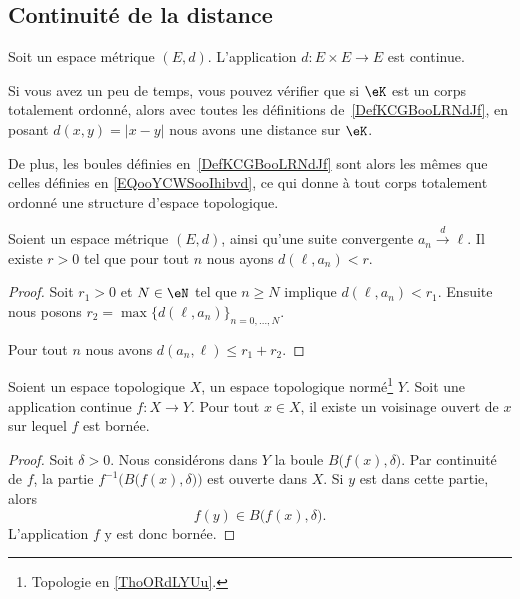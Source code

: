 \subsection{Continuité de la distance}


\begin{proposition}	\label{PROPooSZMLooNdtLLj}
	Soit un espace métrique \( (E,d)\). L'application \(d \colon E\times E\to E  \) est continue.
\end{proposition}


\begin{normaltext}      \label{NORMooJBMXooLHfAJK}
	Si vous avez un peu de temps, vous pouvez vérifier que si \( \eK\) est un corps totalement ordonné, alors avec toutes les définitions de~\ref{DefKCGBooLRNdJf}, en posant \( d(x,y)=| x-y |\) nous avons une distance sur \( \eK\).

	De plus, les boules définies en~\ref{DefKCGBooLRNdJf} sont alors les mêmes que celles définies en \eqref{EQooYCWSooIhibvd}, ce qui donne à tout corps totalement ordonné une structure d'espace topologique.
\end{normaltext}

\begin{proposition}      \label{PROPooUXDJooCrWBbd}
	Soient un espace métrique \( (E,d)\), ainsi qu'une suite convergente \( a_n\stackrel{d}{\longrightarrow}\ell\). Il existe \( r>0\) tel que pour tout \( n\) nous ayons \( d(\ell, a_n)<r\).
\end{proposition}

\begin{proof}
	Soit \( r_1>0\) et \( N\in \eN\) tel que \( n\geq N\) implique \( d(\ell,a_n)<r_1\). Ensuite nous posons \( r_2=\max\{ d(\ell,a_n) \}_{n=0,\ldots, N}\).

	Pour tout \( n\) nous avons \( d(a_n,\ell)\leq r_1+r_2\).
\end{proof}

\begin{proposition}		\label{PROPooNOHQooTqBQLk}
	Soient un espace topologique \( X\), un espace topologique normé\footnote{Topologie en \ref{ThoORdLYUu}.} \( Y\). Soit une application continue \(f \colon X\to Y  \). Pour tout \( x\in X\), il existe un voisinage ouvert de \( x\) sur lequel \( f\) est bornée.
\end{proposition}

\begin{proof}
	Soit \( \delta>0\). Nous considérons dans \( Y\) la boule \( B\big( f(x),\delta \big)\). Par continuité de \( f\), la partie \( f^{-1}\Big( B\big( f(x),\delta \big) \Big)\) est ouverte dans \( X\). Si \( y\) est dans cette partie, alors
	\begin{equation}
		f(y)\in B\big( f(x),\delta \big).
	\end{equation}
	L'application \( f\) y est donc bornée.
\end{proof}

